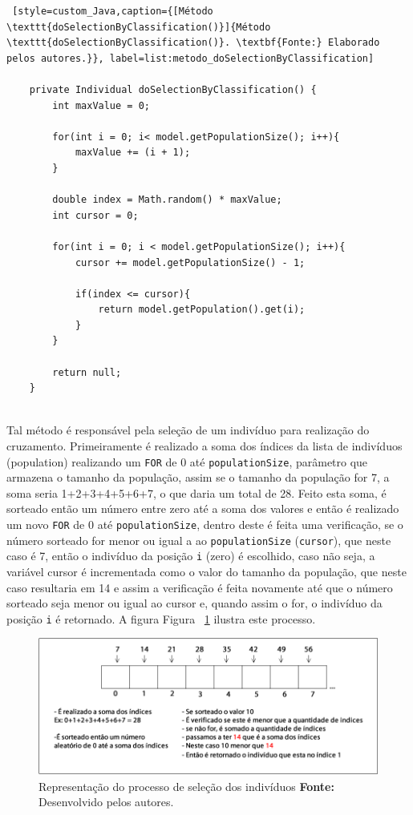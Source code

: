 \begin{lstlisting} [style=custom_Java,caption={[Método \texttt{doSelectionByClassification()}]{Método \texttt{doSelectionByClassification()}. \textbf{Fonte:} Elaborado pelos autores.}}, label=list:metodo_doSelectionByClassification] 

	private Individual doSelectionByClassification() {
		int maxValue = 0;
		
		for(int i = 0; i< model.getPopulationSize(); i++){
			maxValue += (i + 1);
		}
		
		double index = Math.random() * maxValue;
		int cursor = 0;
		
		for(int i = 0; i < model.getPopulationSize(); i++){
			cursor += model.getPopulationSize() - 1;
			
			if(index <= cursor){
				return model.getPopulation().get(i);
			}
		}
		
		return null;
	}


\end{lstlisting}

\par Tal método é responsável pela seleção de um indivíduo para realização do cruzamento. Primeiramente
é realizado a soma dos índices da lista de indivíduos (population) realizando um \texttt{FOR} de 0 até
\texttt{populationSize}, parâmetro que armazena o tamanho da população, assim se o tamanho da população for
7, a soma seria 1+2+3+4+5+6+7, o que daria um total de 28. Feito esta soma, é sorteado então um número 
entre zero até a soma dos valores e então é realizado um novo \texttt{FOR} de 0 até \texttt{populationSize},
dentro deste é feita uma verificação, se o número sorteado for menor ou igual 
a ao \texttt{populationSize} (\texttt{cursor}), que neste caso é 7, então o indivíduo da posição \texttt{i} (zero) é escolhido, 
caso não seja, a variável cursor é incrementada como o valor do tamanho da população, que neste caso resultaria 
em 14 e assim a verificação é feita novamente até que o número sorteado seja menor ou igual ao cursor e, quando assim
o for, o indivíduo da posição \texttt{i} é retornado. A figura Figura ~\ref{fig:ex_selecao} ilustra este processo.

\newpage

\begin{figure}[h!]
	\centerline{\includegraphics[scale=0.6]{./imagens/selecao.png}}
	\caption[Seleção dos indivíduos]
	{Representação do processo de seleção dos indivíduos
		\textbf{Fonte:} Desenvolvido pelos autores.}
	\label{fig:ex_selecao}
\end{figure}

